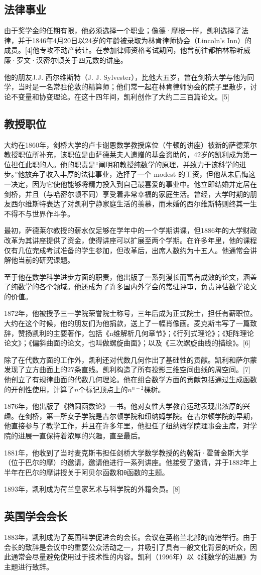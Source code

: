 \subsection{法律事业}  
由于奖学金的任期有限，他必须选择一个职业；像德·摩根一样，凯利选择了法律，并于1846年4月20日以24岁的年龄被录取为林肯律师协会（Lincoln's Inn）的成员。[4]他专攻不动产转让。在参加律师资格考试期间，他曾前往都柏林聆听威廉·罗文·汉密尔顿关于四元数的讲座。

他的朋友J.J. 西尔维斯特（J. J. Sylvester），比他大五岁，曾在剑桥大学与他为同学，当时是一名常驻伦敦的精算师；他们常一起在林肯律师协会的院子里散步，讨论不变量和协变理论。在这十四年间，凯利创作了大约二三百篇论文。[5]
\subsection{教授职位}  
大约在1860年，剑桥大学的卢卡谢恩数学教授席位（牛顿的讲座）被新的萨德莱尔教授职位所补充，该职位是由萨德莱夫人遗赠的基金资助的，42岁的凯利成为第一位担任此职的人。他的职责是“阐明和教授纯数学的原理，并致力于该科学的进步。”他放弃了收入丰厚的法律事业，选择了一个 modest 的工资，但他从未后悔这一决定，因为它使他能够将精力投入到自己最喜爱的事业中。他立即结婚并定居在剑桥，并且（与哈密尔顿不同）享受着非常幸福的家庭生活。曾经，大学时期的朋友西尔维斯特表达了对凯利宁静家庭生活的羡慕，而未婚的西尔维斯特则终其一生不得不与世界作斗争。

最初，萨德莱尔教授的薪水仅足够在学年中的一个学期讲课，但1886年的大学财政改革为其讲座提供了资金，使得讲座可以扩展至两个学期。在许多年里，他的课程仅有几位完成考试准备的学生参加，但改革后，出席人数约为十五人。他通常会讲解他当前的研究课题。

至于他在数学科学进步方面的职责，他出版了一系列漫长而富有成效的论文，涵盖了纯数学的各个领域。他还成为了许多国内外学会的常驻评审，负责评估数学论文的价值。

1872年，他被授予三一学院荣誉院士称号，三年后成为正式院士，担任有薪职位。大约在这个时候，他的朋友们为他捐款，送上了一幅肖像画。麦克斯韦写了一篇致辞，赞扬凯利的主要著作，包括《n维解析几何章节》；《行列式理论》；《矩阵理论论文》；《偏斜曲面的论文，也叫做螺旋曲面》；以及《三次螺旋曲线的描绘》。[6] 

除了在代数方面的工作外，凯利还对代数几何作出了基础性的贡献。凯利和萨尔蒙发现了立方曲面上的27条直线。凯利构造了所有投影三维空间曲线的周空间。[7]他创立了有规律曲面的代数几何理论。他在组合数学方面的贡献包括通过生成函数的开创性使用，计算了\(n\)个标记顶点上的\(n^{n-2}\)棵树。

1876年，他出版了《椭圆函数论》一书。他对女性大学教育运动表现出浓厚的兴趣。在剑桥，第一所女子学院是吉尔顿学院和纽纳姆学院。在吉尔顿学院的早期，他直接参与了教学工作，并且在许多年里，他担任了纽纳姆学院理事会主席，对学院的进展一直保持着浓厚的兴趣，直至最后。

1881年，他收到了当时麦克斯韦担任剑桥大学数学教授的约翰斯·霍普金斯大学（位于巴尔的摩）的邀请，邀请他进行一系列讲座。他接受了邀请，并于1882年上半年在巴尔的摩讲授关于阿贝尔函数和θ函数的主题。

1893年，凯利成为荷兰皇家艺术与科学院的外籍会员。[8]
\subsection{英国学会会长}  
1883年，凯利成为了英国科学促进会的会长。会议在英格兰北部的南港举行。由于会长的致辞是会议中的重要公众活动之一，并吸引了具有一般文化背景的听众，因此通常会尽量避免使用过于技术性的内容。凯利（1996年）以《纯数学的进展》为主题进行致辞。
